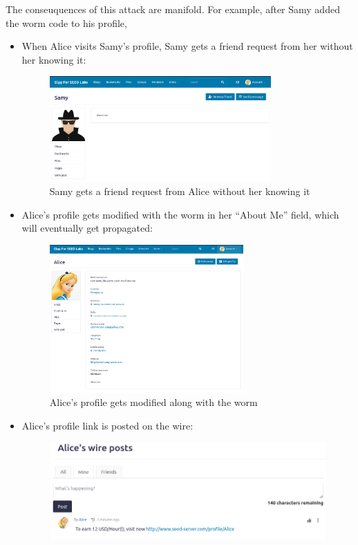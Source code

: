 \documentclass[12pt]{article}
\begin{document}
The conseuquences of this attack are manifold. For example, after Samy added the worm code to his profile,
\begin{itemize}
 \item When Alice visits Samy's profile, Samy gets a friend request from her without her knowing it:
     \begin{figure}[H]
         \centering
         \includegraphics[width=0.8\textwidth]{Images/ss10.png}
         \caption{Samy gets a friend request from Alice without her knowing it}
         \label{fig:ss10}
     \end{figure}
 \item Alice's profile gets modified with the worm in her ``About Me'' field, which will eventually get propagated:
     \begin{figure}[H]
         \centering
         \includegraphics[width=0.7\textwidth]{Images/ss11.png}
         \caption{Alice's profile gets modified along with the worm}
         \label{fig:ss11}
     \end{figure}
 \item Alice's profile link is posted on the wire:
     \begin{figure}[H]
         \centering
         \includegraphics[width=\textwidth]{Images/ss12.png}

\end{figure}
\end{itemize}
\end{document}
